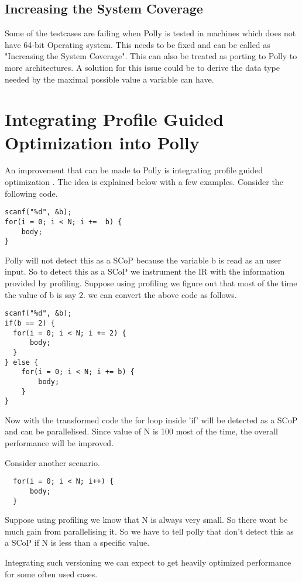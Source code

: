 \subsection{Increasing the System Coverage}

Some of the testcases are failing when Polly is tested in machines which does not
have 64-bit Operating system. This needs to be fixed and can be called as "Increasing the System Coverage".
This can also be treated as porting to Polly to more architectures.
A solution for this issue could be to derive the data type needed by the maximal possible value a variable can have.

\section{Integrating Profile Guided Optimization into Polly}
An improvement that can be made to Polly is integrating profile guided optimization
\cite{pgo}. The idea is explained below with a few examples. Consider the following code.
{\footnotesize
\begin{lstlisting}
scanf("%d", &b);
for(i = 0; i < N; i +=  b) {
    body;
}
\end{lstlisting}
}
Polly will not detect this as a SCoP because the variable b is read as an user
input. So to detect this as a SCoP we instrument the IR with the information
provided by profiling. Suppose using profiling we figure out that most of the 
time the value of b is say 2. we can convert the above code as follows.
{\footnotesize
\begin{lstlisting}
scanf("%d", &b);
if(b == 2) {
  for(i = 0; i < N; i += 2) {
      body;
  }
} else {
    for(i = 0; i < N; i += b) {
        body;
    }
}
\end{lstlisting}
}
Now with the transformed code the for loop inside 'if' will be detected as a 
SCoP and can be parallelised. Since value of N is 100 most of the time, the 
overall performance will be improved.

Consider another scenario.
{\footnotesize
\begin{lstlisting}
  for(i = 0; i < N; i++) {
      body;
  }
\end{lstlisting}
}
Suppose using profiling we know that N is always very small. So there wont be
much gain from parallelising it. So we have to tell polly that don't detect
this as a SCoP if N is less than a specific value.

Integrating such versioning we can expect to get heavily optimized performance 
for some often used cases.


